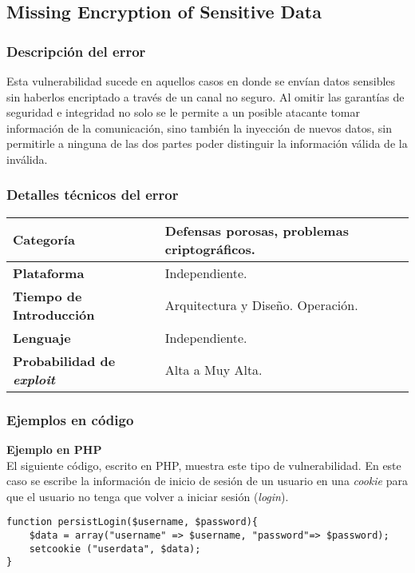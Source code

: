 \subsection{Missing Encryption of Sensitive Data}

\subsubsection{Descripción del error}

Esta vulnerabilidad sucede en aquellos casos en donde se envían datos sensibles sin haberlos encriptado a través de un canal no seguro.
Al omitir las garantías de seguridad e integridad no solo se le permite a un posible atacante tomar información de la comunicación,
sino también la inyección de nuevos datos, sin permitirle a ninguna de las dos partes poder distinguir la información válida de la inválida.

\subsubsection{Detalles técnicos del error}
\begin{tabular}[\baselineskip]{|l|p{7cm}|}
  \hline
  \textbf{Categoría} & Defensas porosas, problemas criptográficos. \\
  \hline
  \textbf{Plataforma} & Independiente. \\
  \hline
  \textbf{Tiempo de Introducción} & Arquitectura y Diseño. Operación. \\
  \hline
  \textbf{Lenguaje} & Independiente. \\
  \hline
  \textbf{Probabilidad de \emph{exploit}} & Alta a Muy Alta. \\
  \hline
\end{tabular}

\subsubsection{Ejemplos en código}

\noindent \textbf{Ejemplo en PHP}\\

El siguiente código, escrito en PHP, muestra este tipo de vulnerabilidad.
En este caso se escribe la información de inicio de sesión de un usuario en una \textit{cookie} para que el usuario no tenga que volver a iniciar sesión (\textit{login}).
\begin{lstlisting}[frame=single]
function persistLogin($username, $password){
    $data = array("username" => $username, "password"=> $password);
    setcookie ("userdata", $data);
}
\end{lstlisting}

